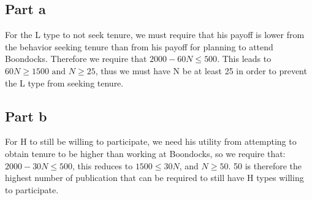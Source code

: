 \documentclass[11pt]{article}
\begin{document}
\subsection{Part a}
\label{sec-2-1}
For the L type to not seek tenure, we must require that his payoff is
lower from the behavior seeking tenure than from his payoff for
planning to attend Boondocks. Therefore we require that $2000 - 60N \leq
500$. This leads to $60N \geq 1500 \text{ and } N \geq 25$, thus we
     must have N be at least 25 in order to prevent the L type from
     seeking tenure.

\subsection{Part b}
\label{sec-2-2}
For H to still be willing to participate, we need his utility from
attempting to obtain tenure to be higher than working at Boondocks, so
we require that: $2000 - 30N \leq 500$, this reduces to $1500 \leq 30N$, and $N
\geq 50$. 50 is therefore the highest number of publication that can be
required to still have H types willing to participate.
\end{document}
